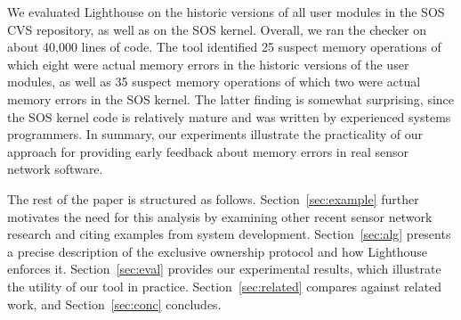 We evaluated Lighthouse on the historic versions of all user modules in the
SOS CVS repository, as well as on the SOS kernel.  
%
Overall, we ran the checker on about 40,000 lines of code.  
%
The tool identified 25 suspect memory operations of which eight were actual
memory errors in the historic versions of the user modules, as well as 35
suspect memory operations of which two were actual memory errors in the SOS
kernel.  
%
The latter finding is somewhat surprising, since the SOS kernel code is
relatively mature and was written by experienced systems programmers.  
%
In summary, our experiments illustrate the practicality of our approach for
providing early feedback about memory errors in real sensor network
software.



The rest of the paper is structured as follows.  
%
Section~\ref{sec:example} further motivates the need for this analysis by
examining other recent sensor network research and citing examples from
system development.
%
Section~\ref{sec:alg} presents a precise description of the exclusive
ownership protocol and how Lighthouse enforces it.  
%
Section~\ref{sec:eval} provides our experimental results, which illustrate
the utility of our tool in practice.  
%
Section~\ref{sec:related} compares against related work, and
Section~\ref{sec:conc} concludes.



